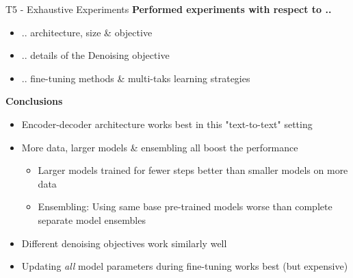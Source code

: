 \begin{frame}{T5 - Exhaustive Experiments}
\small
	\textbf{Performed experiments with respect to ..}
	
	\begin{itemize}
		\item .. architecture, size \& objective
		\item .. details of the Denoising objective
		\item .. fine-tuning methods \& multi-taks learning strategies
	\end{itemize}
	
	\textbf{Conclusions}
	
	\begin{itemize}
		\item Encoder-decoder architecture works best in this "text-to-text" setting
		\item More data, larger models \& ensembling all boost the performance
			\begin{itemize}
				\item Larger models trained for fewer steps better than smaller models on more data
				\item Ensembling: Using same base pre-trained models worse than complete separate model ensembles
			\end{itemize}
		\item Different denoising objectives work similarly well
		\item Updating \textit{all} model parameters during fine-tuning works best (but expensive)
	\end{itemize}
\end{frame}


\endlecture

